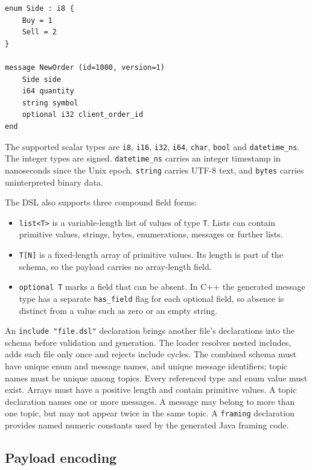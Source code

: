 \begin{verbatim}
enum Side : i8 {
    Buy = 1
    Sell = 2
}

message NewOrder (id=1000, version=1)
    Side side
    i64 quantity
    string symbol
    optional i32 client_order_id
end
\end{verbatim}

The supported scalar types are \texttt{i8}, \texttt{i16}, \texttt{i32},
\texttt{i64}, \texttt{char}, \texttt{bool} and \texttt{datetime\_ns}.
The integer types are signed. \texttt{datetime\_ns} carries an integer
timestamp in nanoseconds since the Unix epoch. \texttt{string} carries UTF-8
text, and \texttt{bytes} carries uninterpreted binary data.

The DSL also supports three compound field forms:
\begin{itemize}[nosep]
  \item \texttt{list<T>} is a variable-length list of values of type
        \texttt{T}. Lists can contain primitive values, strings, bytes,
        enumerations, messages or further lists.
  \item \texttt{T[N]} is a fixed-length array of primitive values. Its length
        is part of the schema, so the payload carries no array-length field.
  \item \texttt{optional T} marks a field that can be absent. In C++ the
        generated message type has a separate \texttt{has\_field} flag for
        each optional field, so absence is distinct from a value such as zero
        or an empty string.
\end{itemize}

An \texttt{include "file.dsl"} declaration brings another file's declarations
into the schema before validation and generation. The loader resolves nested
includes, adds each file only once and rejects include cycles. The combined
schema must have unique enum and message names, and unique message
identifiers; topic names must be unique among topics. Every referenced type
and enum value must exist. Arrays must have a positive length and contain
primitive values. A topic declaration names one or more messages. A message
may belong to more than one topic, but may not appear twice in the same topic.
A \texttt{framing} declaration provides named numeric constants used by the
generated Java framing code.

\subsection{Payload encoding}

